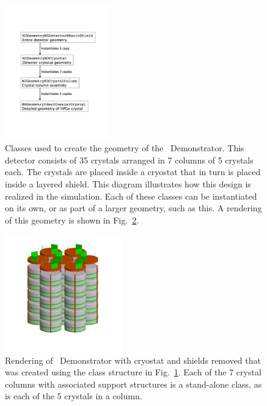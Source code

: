 \documentclass[article]{IEEEtran}
\begin{document}
\begin{figure}[tbh]
\flushleft
\includegraphics[width=0.4\textwidth]{plots/MJDEMOdiagram.pdf}
\caption{Classes used to create the geometry of the \MJ\ {\sc Demonstrator}. This detector consists of 35 crystals arranged in 7 columns of 5 crystals each. The crystals are placed inside a cryostat that in turn is placed inside a layered shield. This diagram illustrates how this design is realized in the simulation. Each of these classes can be instantiated on its own, or as part of a larger geometry, such as this. A rendering of this geometry is shown in Fig.~\ref{fig:MJDEMOrendering}.}\label{fig:MJDEMOGeometry} 
\end{figure}

\begin{figure}[tbh]
\centering
\includegraphics[width=0.45\textwidth]{plots/MJDEMOrendering.pdf}
\caption{Rendering of \MJ\ {\sc Demonstrator} with cryostat and shields removed that was created using the class structure in Fig.~\ref{fig:MJDEMOGeometry}. Each of the 7 crystal columns with associated support structures is a stand-alone class, as is each of the 5 crystals in a column. }
\label{fig:MJDEMOrendering}
\end{figure}
\end{document}
